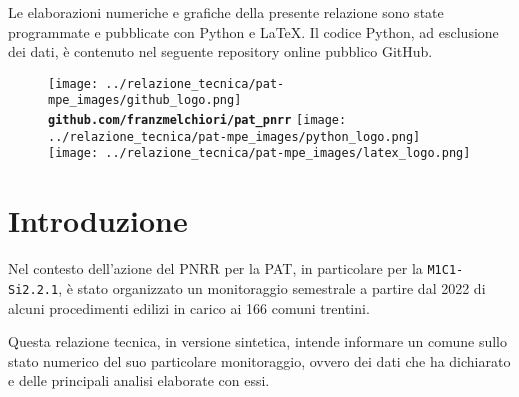 \documentclass[a4paper]{article}
\begin{document}
	\tableofcontents
	\clearpage
	
	Le elaborazioni numeriche e grafiche della presente relazione sono state programmate e pubblicate con Python e LaTeX. Il codice Python, ad esclusione dei dati, è contenuto nel seguente repository online pubblico GitHub.\\
	\begin{figure}[!htbp]
		\begin{center}
			\texttt{[image: ../relazione\_tecnica/pat-mpe\_images/github\_logo.png]} \textbf{\texttt{github.com/franzmelchiori/pat\_pnrr}} \hspace{0.3cm}
			\texttt{[image: ../relazione\_tecnica/pat-mpe\_images/python\_logo.png]} \hspace{0.3cm}
			\texttt{[image: ../relazione\_tecnica/pat-mpe\_images/latex\_logo.png]}\\
		\end{center}
	\end{figure}
	\clearpage

	\section{Introduzione}
	Nel contesto dell'azione del PNRR per la PAT, in particolare per la \texttt{M1C1-Si2.2.1}, è stato organizzato un monitoraggio semestrale a partire dal 2022 di alcuni procedimenti edilizi in carico ai 166 comuni trentini.

	Questa relazione tecnica, in versione sintetica, intende informare un comune sullo stato numerico del suo particolare monitoraggio, ovvero dei dati che ha dichiarato e delle principali analisi elaborate con essi.
\end{document}
